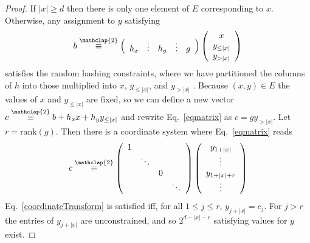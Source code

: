 \documentclass{article}
\newcommand\modt{\stackrel{\mathclap{\normalfont 2}}{\equiv}}
\begin{document}
\begin{proof}
    If $\lvert x \rvert \geq d$ then there is only one element of $E$ corresponding to $x$.
    Otherwise,
    any assignment to $y$ satisfying
    \begin{equation}\label{eqmatrix}
      b \modt \left( \begin{array}{ccccc}
h_{x} & \vdots& h_{y} &\vdots& g %
      \end{array} \right) \left( \begin{array}{c}
x \\
y_{\leq \lvert x \rvert } \\
y_{ > \lvert x \rvert }  \end{array} \right)
    \end{equation}
    satisfies the random hashing constraints, where we have partitioned the columns of $h$ into those multiplied into $x$, $y_{\leq\lvert x \rvert }$, and $y_{ > \lvert x \rvert }$ .
    Because $(x,y)\in E$ the values of $x$ and $y_{\leq \lvert x \rvert }$ are fixed,
    so we can define a new vector $c \modt b + h_x x + h_y y_{\leq \lvert x \rvert }$ and rewrite Eq.~\ref{eqmatrix} as
    $c = g y_{ > \lvert x \rvert }$.
    Let $r = \text{rank}(g)$.
    Then there is a coordinate system where Eq.~\ref{eqmatrix} reads
    \begin{equation}\label{coordinateTransform}
      c \modt \left( \begin{array}{cccc}
        1&&&\\
        &\ddots&&\\
        &&0&\\
        &&&\ddots \end{array} \right) \left( \begin{array}{c}
        y_{1+\lvert x \rvert } \\
        \vdots\\
        y_{1+\lvert x \rvert +r}\\
        \vdots\end{array} \right)
    \end{equation}
    Eq.~\ref{coordinateTransform}     is satisfied iff, for all $1\leq j\leq r$, $y_{j+\lvert x \rvert } = c_j$.
    For $j > r$ the entries of $y_{j+\lvert x \rvert } $ are unconstrained,
    and so $2^{d  - \lvert x \rvert  - r}$  satisfying values for $y$ exist.
\end{proof}
\end{document}
